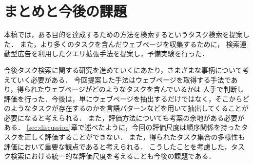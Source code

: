 \documentclass[submit,techreq]{ipsj}
\begin{document}
\begin{table}[t] 
\caption{クエリ拡張により新しく得られた行動のsubtype-of関係，instance-of関係による分類結果} 
\label{tbl:subtype}
\begin{center}
\end{center}
\vspace{-1.0em}
\end{table}





\section{まとめと今後の課題}
本稿では，ある目的を達成するための方法を検索するというタスク検索を提案した．
また，より多くのタスクを含んだウェブページを収集するために，
検索連動型広告を利用したクエリ拡張手法を提案し，予備実験を行った．

今後タスク検索に関する研究を進めていくにあたり，さまざまな事柄について考えていく必要がある．
今回提案した手法はウェブページを取得する手法であり，得られたウェブページがどのようなタスクを含んでいるかは
人手で判断し評価を行った．今後は，単にウェブページを抽出するだけではなく，そこからどのようなタスクが存在するのかを言語パターンなどを用いて抽出してくることが必要になると考えられる．
また，評価方法についても考案の余地がある必要がある．
\ref{sec:discussion}章で述べたように，今回の評価尺度は順序関係を持ったタスクを正しく評価することができない．
また，得られたタスク集合の多様性も評価において重要な観点であると考えられる．
こうしたことを考慮した，タスク検索における統一的な評価尺度を考えることも今後の課題である．
\end{document}
